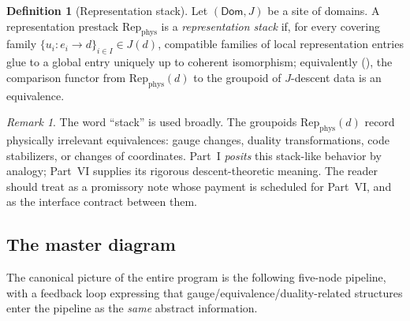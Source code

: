 \documentclass[12pt]{article}
\theoremstyle{definition}
\newtheorem{definition}[theorem]{Definition}
\theoremstyle{remark}
\newtheorem{remark}[theorem]{Remark}
\newcommand{\Dom}{\mathsf{Dom}}
\newcommand{\Repphys}{\mathrm{Rep}_{\mathrm{phys}}}
\begin{document}
\begin{definition}[Representation stack]
\label{def:stack}
Let $(\Dom, J)$ be a site of domains. A representation prestack $\Repphys$ is a
\emph{representation stack} if, for every covering family
$\{u_i : e_i \to d\}_{i \in I} \in J(d)$, compatible families of local
representation entries glue to a global entry uniquely up to coherent
isomorphism; equivalently (), the comparison functor from
$\Repphys(d)$ to the groupoid of $J$-descent data is an equivalence.
\end{definition}

\begin{remark}
\label{rem:stack-broad}
The word ``stack'' is used broadly. The groupoids $\Repphys(d)$ record
physically irrelevant equivalences: gauge changes, duality transformations,
code stabilizers, or changes of coordinates. Part~I
\emph{posits} this stack-like behavior by analogy; Part~VI supplies its rigorous
descent-theoretic meaning. The reader should treat  as a
promissory note whose payment is scheduled for Part~VI, and 
as the interface contract between them.
\end{remark}

\subsection{The master diagram}

The canonical picture of the entire program is the following five-node pipeline,
with a feedback loop expressing that gauge/equivalence/duality-related structures
enter the pipeline as the \emph{same} abstract information.
\end{document}

